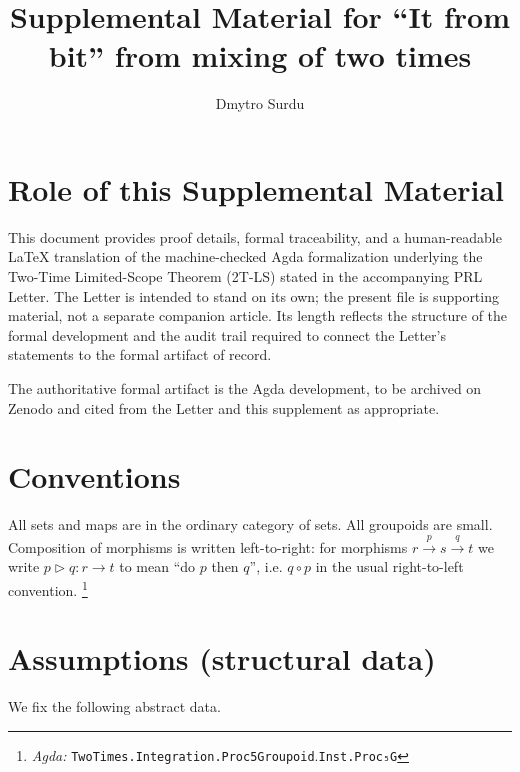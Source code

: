 \documentclass{article}
\title{Supplemental Material for ``It from bit'' from mixing of two times}
\author{Dmytro Surdu}
\date{}
\newcommand{\Agda}[1]{\texttt{#1}}
\newcommand{\AgdaRef}[2]{\emph{Agda: }\Agda{#1}.\Agda{#2}}
\newcommand{\AgdaNote}[2]{\footnote{\AgdaRef{#1}{#2}}}
\theoremstyle{definition}
\theoremstyle{plain}
\begin{document}
\maketitle


\section*{Role of this Supplemental Material}
This document provides proof details, formal traceability, and a human-readable
LaTeX translation of the machine-checked Agda formalization underlying the
Two-Time Limited-Scope Theorem (2T-LS) stated in the accompanying PRL Letter.
The Letter is intended to stand on its own; the present file is supporting
material, not a separate companion article. Its length reflects the structure
of the formal development and the audit trail required to connect the Letter's
statements to the formal artifact of record.

The authoritative formal artifact is the Agda development, to be archived on
Zenodo and cited from the Letter and this supplement as appropriate.

\section*{Conventions}\label{sec:limited-scope-theorem-translation-001}
All sets and maps are in the ordinary category of sets.
All groupoids are small.
Composition of morphisms is written left-to-right: for morphisms
$r\xrightarrow{p}s\xrightarrow{q}t$ we write $p\triangleright q:r\to t$ to mean
``do $p$ then $q$'', i.e. $q\circ p$ in the usual right-to-left convention.
\AgdaNote{TwoTimes.Integration.Proc5Groupoid}{Inst.Proc₅G}

\section{Assumptions (structural data)}
\label{sec:assumptions}
We fix the following abstract data.
\end{document}

